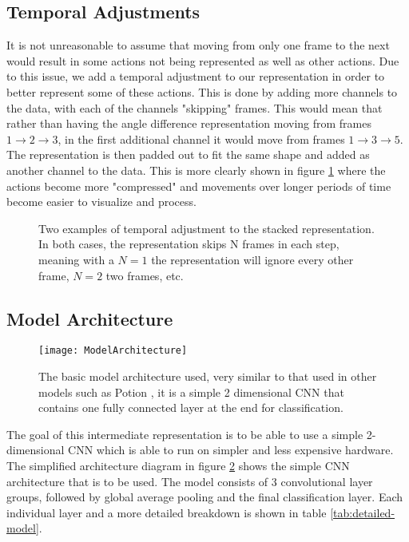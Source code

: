 \subsection{Temporal Adjustments}

It is not unreasonable to assume that moving from only one frame to the next would result in some actions not being represented as well as other actions. Due to this issue, we add a temporal adjustment to our representation in order to better represent some of these actions. This is done by adding more channels to the data, with each of the channels "skipping" frames. This would mean that rather than having the angle difference representation moving from frames $1 \rightarrow 2 \rightarrow 3$, in the first additional channel it would move from frames $1 \rightarrow 3 \rightarrow 5$. The representation is then padded out to fit the same shape and added as another channel to the data. This is more clearly shown in figure \ref{fig:intermediate-stacked-skip} where the actions become more "compressed" and movements over longer periods of time become easier to visualize and process.

\begin{figure}[ht]
	\centering
	\caption{Two examples of temporal adjustment to the stacked representation. In both cases, the representation skips N frames in each step, meaning with a $N = 1$ the representation will ignore every other frame, $N = 2$ two frames, etc.}
	\label{fig:intermediate-stacked-skip}
\end{figure}

\subsection{Model Architecture}

\begin{figure}[ht]
	\texttt{[image: ModelArchitecture]}
	\centering
	\caption{The basic model architecture used, very similar to that used in other models such as Potion \cite{potion}, it is a simple 2 dimensional CNN that contains one fully connected layer at the end for classification.}
	\label{fig:model-architecture}
\end{figure}

The goal of this intermediate representation is to be able to use a simple 2-dimensional CNN which is able to run on simpler and less expensive hardware. The simplified architecture diagram in figure \ref{fig:model-architecture} shows the simple CNN architecture that is to be used. The model consists of 3 convolutional layer groups, followed by global average pooling and the final classification layer. Each individual layer and a more detailed breakdown is shown in table \ref{tab:detailed-model}.

